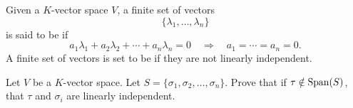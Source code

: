 \documentclass{ximera}
\begin{document}
\begin{definition}
  Given a $K$-vector space $V$, a finite set of vectors
  \[
  \{\lambda_1,\dots,\lambda_n\}
  \]
  is said to be  if
  \[
  a_1\lambda_1 + a_2\lambda_2 +\cdots + a_n\lambda_n = 0\quad \Rightarrow \quad a_1= \cdots =a_n = 0.
  \]
  A finite set of vectors is set to be  if
  they are not linearly independent.
\end{definition}



\begin{exercise}
  Let $V$ be a $K$-vector space. Let $S= \{\sigma_1,\sigma_2,
  \dots,\sigma_n\}$. Prove that if $\tau\notin\operatorname{Span}(S)$, that $\tau$
  and $\sigma_i$ are linearly independent.
\end{exercise}


\end{document}
